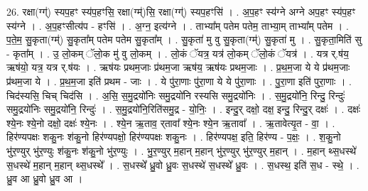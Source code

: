 \documentclass[17pt]{extarticle}
\begin{document}
26. रक्षा(ग्ग्॑) स्यप॒हꣳ स्य॑प॒हꣳसि॒ रक्षा(ग्म्॑)सि॒ रक्षा(ग्ग्॑) स्यप॒हꣳसि॑ । . अ॒प॒हꣳ स्य॑ग्ने अग्ने अप॒हꣳ स्य॑प॒हꣳ स्य॑ग्ने । . अ॒प॒हꣳसीत्य॑प - हꣳसि॑ । . अ॒ग्न॒ इत्य॑ग्ने । . ताभ्या᳚म् पतेम पतेम॒ ताभ्या॒म् ताभ्या᳚म् पतेम । . प॒ते॒म॒ सु॒कृता(ग्म्॑) सु॒कृता᳚म् पतेम पतेम सु॒कृता᳚म् । . सु॒कृता॑ मु वु सु॒कृता(ग्म्॑) सु॒कृता॑ मु । . सु॒कृता॒मिति॑ सु - कृता᳚म् । . उ॒ लो॒कम् ॅलो॒क मु॑ वु लो॒कम् । . लो॒कं ॅयत्र॒ यत्र॑ लो॒कम् ॅलो॒कं ॅयत्र॑ । . यत्र र्.ष॑य॒ ऋष॑यो॒ यत्र॒ यत्र र्.ष॑यः । . ऋष॑यः प्रथम॒जाः प्र॑थम॒जा ऋष॑य॒ ऋष॑यः प्रथम॒जाः । . प्र॒थ॒म॒जा ये ये प्र॑थम॒जाः प्र॑थम॒जा ये । . प्र॒थ॒म॒जा इति॑ प्रथम - जाः । . ये पु॑रा॒णाः पु॑रा॒णा ये ये पु॑रा॒णाः । . पु॒रा॒णा इति॑ पुरा॒णाः । . चिद॑स्यसि॒ चिच् चिद॑सि । . अ॒सि॒ स॒मु॒द्रयो॑निः समु॒द्रयो॑नि रस्यसि समु॒द्रयो॑निः । . स॒मु॒द्रयो॑नि॒ रिन्दु॒ रिन्दुः॑ समु॒द्रयो॑निः समु॒द्रयो॑नि॒ रिन्दुः॑ । . स॒मु॒द्रयो॑नि॒रिति॑समु॒द्र - यो॒निः॒ । . इन्दु॒र् दक्षो॒ दक्ष॒ इन्दु॒ रिन्दु॒र् दक्षः॑ । . दक्षः॑ श्ये॒नः श्ये॒नो दक्षो॒ दक्षः॑ श्ये॒नः । . श्ये॒न ऋ॒ताव॒ र्‌तावा᳚ श्ये॒नः श्ये॒न ऋ॒तावा᳚ । . ऋ॒तावेत्यृ॒त - वा॒ । . हिर॑ण्यपक्षः शकु॒नः श॑कु॒नो हिर॑ण्यपक्षो॒ हिर॑ण्यपक्षः शकु॒नः । . हिर॑ण्यपक्ष॒ इति॒ हिर॑ण्य - प॒क्षः॒ । . श॒कु॒नो भु॑र॒ण्युर् भु॑र॒ण्युः श॑कु॒नः श॑कु॒नो भु॑र॒ण्युः । . भु॒र॒ण्युर् म॒हान् म॒हान् भु॑र॒ण्युर् भु॑र॒ण्युर् म॒हान् । . म॒हान् थ्स॒धस्थे॑ स॒धस्थे॑ म॒हान् म॒हान् थ्स॒धस्थे᳚ । . स॒धस्थे᳚ ध्रु॒वो ध्रु॒वः स॒धस्थे॑ स॒धस्थे᳚ ध्रु॒वः । . स॒धस्थ॒ इति॑ स॒ध - स्थे॒ । . ध्रु॒व आ ध्रु॒वो ध्रु॒व आ । \newline
\end{document}
